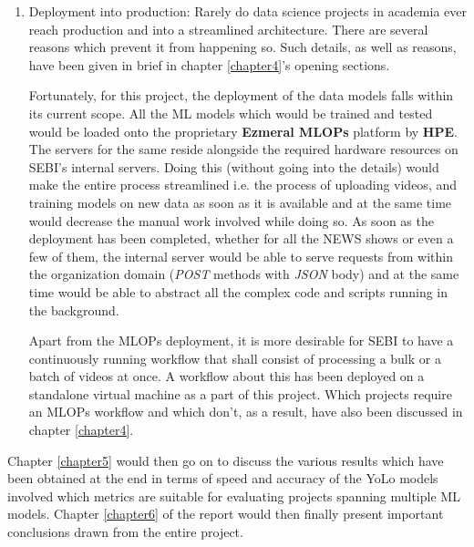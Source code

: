 \begin{enumerate}
  \item Deployment into production: Rarely do data science projects in academia ever reach production and into a streamlined architecture. There are several reasons which prevent it from happening so. Such details, as well as reasons, have been given in brief in chapter \ref{chapter4}’s opening sections. \par
   Fortunately, for this project, the deployment of the data models falls within its current scope. All the ML models which would be trained and tested would be loaded onto the proprietary \textbf{Ezmeral MLOPs} platform by \textbf{HPE}. The servers for the same reside alongside the required hardware resources on SEBI’s internal servers. Doing this (without going into the details) would make the entire process streamlined i.e. the process of uploading videos, and training models on new data as soon as it is available and at the same time would decrease the manual work involved while doing so. As soon as the deployment has been completed, whether for all the NEWS shows or even a few of them, the internal server would be able to serve requests from within the organization domain (\textit{POST} methods with \textit{JSON} body) and at the same time would be able to abstract all the complex code and scripts running in the background. \par

   Apart from the MLOPs deployment, it is more desirable for SEBI to have a continuously running workflow that shall consist of processing a bulk or a batch of videos at once. A workflow about this has been deployed on a standalone virtual machine as a part of this project. Which projects require an MLOPs workflow and which don’t, as a result, have also been discussed in chapter \ref{chapter4}.
\end{enumerate}


Chapter \ref{chapter5} would then go on to discuss the various results which have been obtained at the end in terms of speed and accuracy of the YoLo models involved which metrics are suitable for evaluating projects spanning multiple ML models. Chapter \ref{chapter6} of the report would then finally present important conclusions drawn from the entire project.
